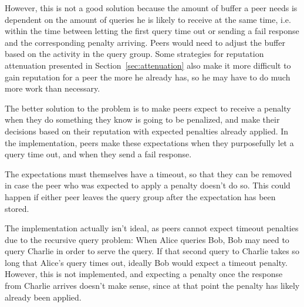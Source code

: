 However, this is not a good solution because the amount of buffer a peer needs
is dependent on the amount of queries he is likely to receive at the same time,
i.e. within the time between letting the first query time out or sending a fail
response and the corresponding penalty arriving. Peers would need to adjust the
buffer based on the activity in the query group. Some strategies for reputation
attenuation presented in Section~\ref{sec:attenuation} also make it more
difficult to gain reputation for a peer the more he already has, so he may have
to do much more work than necessary.

The better solution to the problem is to make peers expect to receive a penalty
when they do something they know is going to be penalized, and make their
decisions based on their reputation with expected penalties already applied. In
the implementation, peers make these expectations when they purposefully let a
query time out, and when they send a fail response.

The expectations must themselves have a timeout, so that they can be removed in
case the peer who was expected to apply a penalty doesn't do so. This could
happen if either peer leaves the query group after the expectation has been
stored.

The implementation actually isn't ideal, as peers cannot expect timeout
penalties due to the recursive query problem: When Alice queries Bob, Bob may
need to query Charlie in order to serve the query. If that second query to
Charlie takes so long that Alice's query times out, ideally Bob would expect a
timeout penalty. However, this is not implemented, and expecting a penalty once
the response from Charlie arrives doesn't make sense, since at that point the
penalty has likely already been applied.

